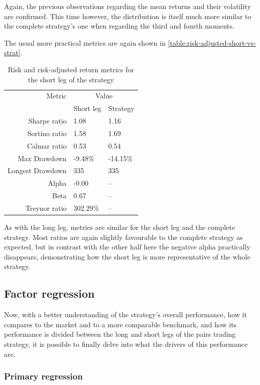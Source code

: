 Again, the previous observations regarding the mean returns and their volatility are confirmed. This time however, the distribution is itself much more similar to the complete strategy's one when regarding the third and fourth moments. 

The usual more practical metrics are again shown in \autoref{table:risk-adjusted-short-vs-strat}.
\begin{table}[ht]
    \centering
    \begin{tabular}{rll}
        \toprule
        Metric & \multicolumn{2}{c}{Value} \\ 
        \cmidrule(lr){2-3}
            & Short leg & Strategy \\
        \midrule
        Sharpe ratio & 1.08 & 1.16 \\
        Sortino ratio & 1.58 & 1.69 \\
        Calmar ratio & 0.53 & 0.54 \\
        Max Drawdown & -9.48\% & -14.15\% \\
        Longest Drawdown & 335 & 335 \\
        Alpha & -0.00 & -- \\
        Beta & 0.67 & -- \\
        Treynor ratio & 302.29\% & -- \\
        \bottomrule
    \end{tabular}
    \caption{Risk and risk-adjusted return metrics for the short leg of the strategy}
    \label{table:risk-adjusted-short-vs-strat}
\end{table}

As with the long leg, metrics are similar for the short leg and the complete strategy. Most ratios are again slightly favourable to the complete strategy as expected, but in contrast with the other half here the negative alpha practically disappears, demonstrating how the short leg is more representative of the whole strategy. 


\subsection{Factor regression}
Now, with a better understanding of the strategy's overall performance, how it compares to the market and to a more comparable benchmark, and how its performance is divided between the long and short legs of the pairs trading strategy, it is possible to finally delve into what the drivers of this performance are. 

\subsubsection{Primary regression}

